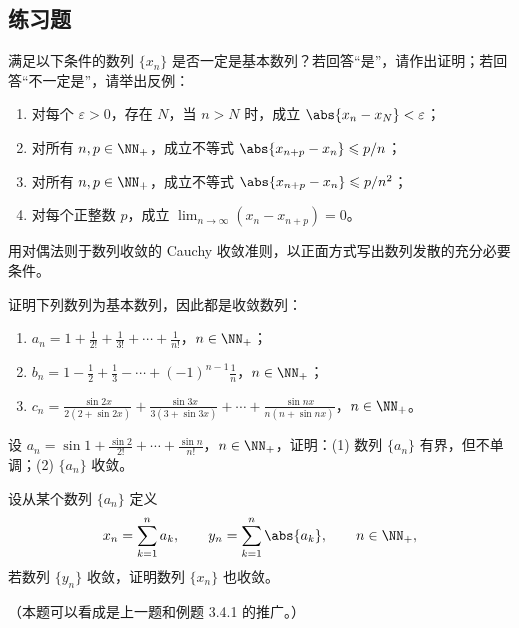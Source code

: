 \subsection{练习题}

\begin{xexercise}[1]
满足以下条件的数列 $\{x_n\}$ 是否一定是基本数列？若回答“是”，请作出证明；若回答“不一定是”，请举出反例：
  \begin{enumerate}[label=(\arabic*)]
    \item 对每个 $\varepsilon>0$，存在 $N$，当 $n>N$ 时，成立 $\abs{x_n-x_N}<\varepsilon$；
    \item 对所有 $n,p\in\NN_+$，成立不等式 $\abs{x_{n+p}-x_n}\leqslant p/n$；
    \item 对所有 $n,p\in\NN_+$，成立不等式 $\abs{x_{n+p}-x_n}\leqslant p/n^2$；
    \item 对每个正整数 $p$，成立 $\lim_{n\to\infty}(x_n-x_{n+p})=0$。
  \end{enumerate}
\end{xexercise}

\begin{xexercise}[2]
用对偶法则于数列收敛的 Cauchy 收敛准则，以正面方式写出数列发散的充分必要条件。
\end{xexercise}

\begin{xexercise}[3]
证明下列数列为基本数列，因此都是收敛数列：
  \begin{enumerate}[label=(\arabic*)]
    \item $a_n=1+\frac1{2!}+\frac1{3!}+\cdots+\frac1{n!}$，$n\in\NN_+$；
    \item $b_n=1-\frac12+\frac13-\cdots+(-1)^{n-1}\frac1n$，$n\in\NN_+$；
    \item $c_n=\frac{\sin2x}{2(2+\sin2x)}+\frac{\sin3x}{3(3+\sin3x)}+\cdots+\frac{\sin nx}{n(n+\sin nx)}$，$n\in\NN_+$。
  \end{enumerate}
\end{xexercise}

\begin{xexercise}[4]
设 $a_n=\sin1+\frac{\sin2}{2!}+\cdots+\frac{\sin n}{n!}$，$n\in\NN_+$，证明：(1) 数列 $\{a_n\}$ 有界，但不单调；(2) $\{a_n\}$ 收敛。
\end{xexercise}

\begin{xexercise}[5]
设从某个数列 $\{a_n\}$ 定义
  \[
    x_n=\sum_{k=1}^{n}a_k,\qquad y_n=\sum_{k=1}^{n}\abs{a_k},\qquad n\in\NN_+,
  \]
  若数列 $\{y_n\}$ 收敛，证明数列 $\{x_n\}$ 也收敛。

  （本题可以看成是上一题和例题 3.4.1 的推广。）
\end{xexercise}


